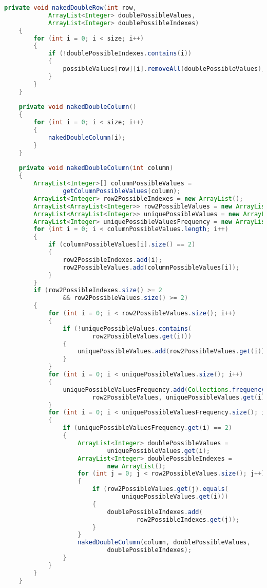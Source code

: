 \begin{lstlisting}[language=Java,basicstyle=\tiny,caption=SolverRuleBased.java]
    private void nakedDoubleRow(int row, 
            ArrayList<Integer> doublePossibleValues, 
            ArrayList<Integer> doublePossibleIndexes)
    {
        for (int i = 0; i < size; i++)
        {
            if (!doublePossibleIndexes.contains(i))
            {
                possibleValues[row][i].removeAll(doublePossibleValues);
            }
        }
    }
    
    private void nakedDoubleColumn()
    {
        for (int i = 0; i < size; i++)
        {
            nakedDoubleColumn(i);
        }
    }
    
    private void nakedDoubleColumn(int column)
    {
        ArrayList<Integer>[] columnPossibleValues = 
                getColumnPossibleValues(column);
        ArrayList<Integer> row2PossibleIndexes = new ArrayList();
        ArrayList<ArrayList<Integer>> row2PossibleValues = new ArrayList();
        ArrayList<ArrayList<Integer>> uniquePossibleValues = new ArrayList();
        ArrayList<Integer> uniquePossibleValuesFrequency = new ArrayList();
        for (int i = 0; i < columnPossibleValues.length; i++)
        {
            if (columnPossibleValues[i].size() == 2)
            {
                row2PossibleIndexes.add(i);
                row2PossibleValues.add(columnPossibleValues[i]);
            }
        }
        if (row2PossibleIndexes.size() >= 2 
                && row2PossibleValues.size() >= 2)
        {
            for (int i = 0; i < row2PossibleValues.size(); i++)
            {
                if (!uniquePossibleValues.contains(
                        row2PossibleValues.get(i)))
                {
                    uniquePossibleValues.add(row2PossibleValues.get(i));
                }
            }
            for (int i = 0; i < uniquePossibleValues.size(); i++)
            {
                uniquePossibleValuesFrequency.add(Collections.frequency(
                        row2PossibleValues, uniquePossibleValues.get(i)));
            }
            for (int i = 0; i < uniquePossibleValuesFrequency.size(); i++)
            {
                if (uniquePossibleValuesFrequency.get(i) == 2)
                {
                    ArrayList<Integer> doublePossibleValues = 
                            uniquePossibleValues.get(i);
                    ArrayList<Integer> doublePossibleIndexes = 
                            new ArrayList();
                    for (int j = 0; j < row2PossibleValues.size(); j++)
                    {
                        if (row2PossibleValues.get(j).equals(
                                uniquePossibleValues.get(i)))
                        {
                            doublePossibleIndexes.add(
                                    row2PossibleIndexes.get(j));
                        }
                    }
                    nakedDoubleColumn(column, doublePossibleValues,
                            doublePossibleIndexes);
                }
            }
        }
    }
    

\end{lstlisting}
